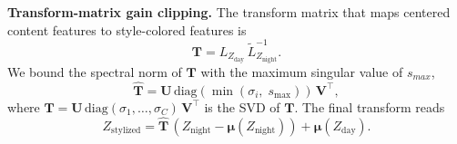 \documentclass{article}
\begin{document}
\noindent\textbf{Transform-matrix gain clipping.}
The transform matrix that maps centered content features to style-colored features is
\begin{equation}
    \bm{T} ={L}_{Z_{\text{day}}}\, \widetilde{L}_{Z_{\text{night}}}^{-1}.
\end{equation}
We bound the spectral norm of $\bm{T}$ with the maximum singular value of $s_{max}$,
\begin{equation}
    \widehat{\bm{T}} = \bm{U}\, \mathrm{diag}\!\left(\min(\sigma_i,\; s_{\max})\right)\, \bm{V}^{\!\top},
\end{equation}
where $\bm{T} = \bm{U}\, \mathrm{diag}(\sigma_1, \ldots, \sigma_C)\, \bm{V}^{\!\top}$ is the SVD of $\bm{T}$. The final transform reads
\begin{equation}
    Z_{\text{stylized}} = \widehat{\bm{T}}\, (Z_{\text{night}} - \bm{\mu}(Z_{\text{night}})) + \bm{\mu}(Z_{\text{day}}).
\end{equation}
\end{document}
